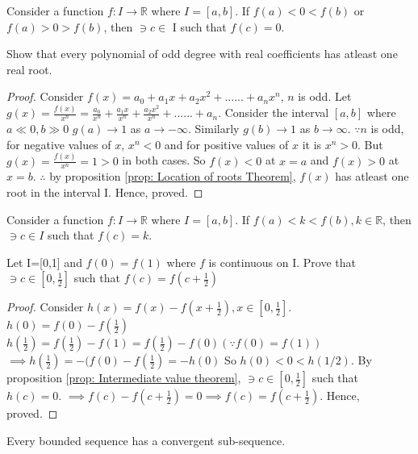 \documentclass[journal,12pt,twocolumn]{IEEEtran}
\begin{document}
\begin{proposition}
\label{prop: Location of roots Theorem}
Consider a function $f:I \to \mathbb{R}$ where $I=[a,b]$. If $f(a)<0<f(b)$ or $f(a)>0>f(b)$, then $\ni c \in$ I such that $f(c)=0$.
\end{proposition}
\begin{problem}
Show that every polynomial of odd degree with real coefficients has atleast one real root.
\end{problem}
\begin{proof}
Consider $f(x)=a_0+a_1x+a_2x^2+......+a_nx^n$, $n$ is odd. Let $g(x)=\frac{f(x)}{x^n}=\frac{a_0}{x^n} + \frac{a_1x}{x^n} + \frac{a_2x^2}{x^n} + ...... +a_n$. Consider the interval $[a,b]$ where $a\ll0,b\gg0$ 
$g(a) \to 1$ as $a \to -\infty$. Similarly $g(b) \to 1$ as $b \to \infty$. 
$\because n$ is odd, for negative values of $x$, $x^n <0$ and for positive values of $x$ it is $x^n>0$. But $g(x)=\frac{f(x)}{x^n}=1>0$ in both cases. So $f(x) < 0$ at $x=a$ and $f(x) >0$ at $x=b$. $\therefore$ by proposition \ref{prop: Location of roots Theorem}, $f(x)$ has atleast one root in the interval I. Hence, proved.  
\end{proof}
\begin{proposition}
\label{prop: Intermediate value theorem}
Consider a function $f:I \to \mathbb{R}$ where $I=[a,b]$. If $f(a)<k<f(b),k\in\mathbb{R}$, then $\ni c\in I$ such that $f(c)=k$.
\end{proposition}
\begin{problem}
Let I=[0,1] and $f(0)=f(1)$ where $f$ is continuous on I. Prove that $\ni c \in[0,\frac{1}{2}]$ such that  $f(c)=f(c+\frac{1}{2})$
\end{problem}
\begin{proof}
Consider $h(x)=f(x)-f(x+\frac{1}{2}),x\in[0,\frac{1}{2}]$.
\\
$h(0)=f(0)-f(\frac{1}{2})$
\\
$h(\frac{1}{2})=f(\frac{1}{2})-f(1)=f(\frac{1}{2})-f(0)(\because f(0)=f(1))$
\\
$\implies h(\frac{1}{2})=-(f(0)-f(\frac{1}{2})=-h(0)$
So $h(0)<0<h(1/2)$. By proposition \ref{prop: Intermediate value theorem}, $\ni c \in[0,\frac{1}{2}]$ such that $h(c)=0$.
$\implies f(c)-f(c+\frac{1}{2})=0 \implies f(c)=f(c+\frac{1}{2})$.
Hence, proved.
\end{proof}
\begin{proposition}
\label{prop: Bolzano-Weirstrass theorem}
Every bounded sequence has a convergent sub-sequence.
\end{proposition}
\end{document}
